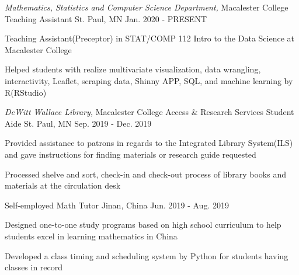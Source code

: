 

\begin{cventries}

  \cventry
    {\textit{Mathematics, Statistics and Computer Science Department,} Macalester College} %
    {Teaching Assistant} %
    {St. Paul, MN} %
    {Jan. 2020 - PRESENT} %
    {
      \begin{cvitems} %
        \item {Teaching Assistant(Preceptor) in STAT/COMP 112 Intro to the Data Science at Macalester College}
        \item {Helped students with realize multivariate visualization, data wrangling, interactivity, Leaflet, scraping data, Shinny APP, SQL, and machine learning by R(RStudio)}
      \end{cvitems}
    }

  \cventry
    {\textit{DeWitt Wallace Library,} Macalester College} %
    {Access \& Research Services Student Aide} %
    {St. Paul, MN} %
    {Sep. 2019 - Dec. 2019} %
    {
      \begin{cvitems} %
        \item {Provided assistance to patrons in regards to the Integrated Library System(ILS) and gave instructions for finding materials or research guide requested}
        \item {Processed shelve and sort, check-in and check-out process of library books and materials at the circulation desk}
      \end{cvitems}
    }

   \cventry
    {Self-employed} %
    {Math Tutor} %
    {Jinan, China} %
    {Jun. 2019 - Aug. 2019} %
    {
      \begin{cvitems} %
        \item {Designed one-to-one study programs based on high school curriculum to help students excel in learning mathematics in China}
        \item {Developed a class timing and scheduling system by Python for students having classes in record}
      \end{cvitems}
    }
    

\end{cventries}
